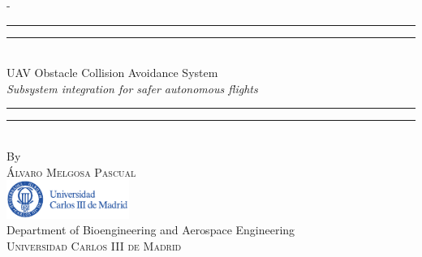 %
%
% 
%
%
\begin{titlingpage}
\begin{SingleSpace}
\calccentering{\unitlength} 
\begin{adjustwidth*}{\unitlength}{-\unitlength}
\vspace*{13mm}
\begin{center}
\rule[0.5ex]{\linewidth}{2pt}\vspace*{-\baselineskip}\vspace*{3.2pt}
\rule[0.5ex]{\linewidth}{1pt}\\[\baselineskip]
{\sc \huge UAV Obstacle Collision Avoidance System }\\[4mm]
{\Large \textit{ Subsystem integration for safer autonomous flights }}\\
\rule[0.5ex]{\linewidth}{1pt}\vspace*{-\baselineskip}\vspace{3.2pt}
\rule[0.5ex]{\linewidth}{2pt}\\
\vspace{1cm}
{\large By}\\
\vspace{0.5cm}
{\large\textsc{\'Alvaro Melgosa Pascual}}\\
\vspace{2cm}
\includegraphics[trim={0 0 2.13cm 0},clip, width=0.3\textwidth]{logos/logoUC3M.pdf}\\
\vspace{1cm}
{\large Department of Bioengineering and Aerospace Engineering\\
\textsc{Universidad Carlos III de Madrid}}\\

\end{center}
\end{adjustwidth*}
\end{SingleSpace}
\end{titlingpage}
